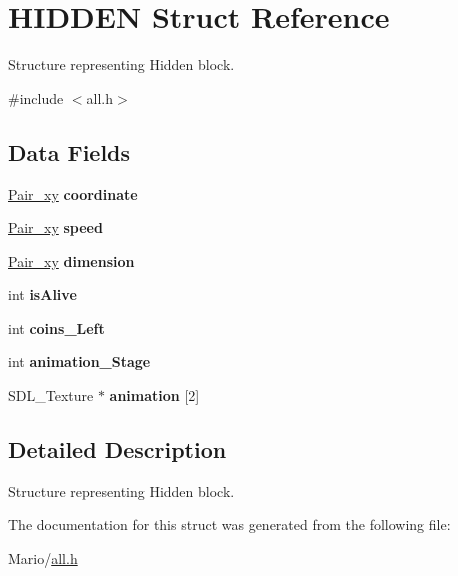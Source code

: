 \hypertarget{struct_h_i_d_d_e_n}{}\section{H\+I\+D\+D\+EN Struct Reference}
\label{struct_h_i_d_d_e_n}


Structure representing Hidden block.  




{\ttfamily \#include $<$all.\+h$>$}

\subsection*{Data Fields}
\begin{DoxyCompactItemize}
\item 
\mbox{\label{struct_h_i_d_d_e_n_a6cf77a9254df5cfd669084e0a97d9711}} 
\mbox{\hyperlink{all_8h_a9a35f73dcc6cf9a466e6542847bd8882}{Pair\+\_\+xy}} {\bfseries coordinate}
\item 
\mbox{\label{struct_h_i_d_d_e_n_a17e25b2ef4c597ac58da845ec3bce5c6}} 
\mbox{\hyperlink{all_8h_a9a35f73dcc6cf9a466e6542847bd8882}{Pair\+\_\+xy}} {\bfseries speed}
\item 
\mbox{\label{struct_h_i_d_d_e_n_a0da7d680eb31a67eac3371518ae0a6cb}} 
\mbox{\hyperlink{all_8h_a9a35f73dcc6cf9a466e6542847bd8882}{Pair\+\_\+xy}} {\bfseries dimension}
\item 
\mbox{\label{struct_h_i_d_d_e_n_a116ae74d5b3df6d48cdb0f3a6bb36a07}} 
int {\bfseries is\+Alive}
\item 
\mbox{\label{struct_h_i_d_d_e_n_a05760377f2ce05f70f79d913f09a67e6}} 
int {\bfseries coins\+\_\+\+Left}
\item 
\mbox{\label{struct_h_i_d_d_e_n_a6118bdc05fce34a198c8e8d332708235}} 
int {\bfseries animation\+\_\+\+Stage}
\item 
\mbox{\label{struct_h_i_d_d_e_n_a1fcacba509b1d227e8ed36abf701510b}} 
S\+D\+L\+\_\+\+Texture $\ast$ {\bfseries animation} \mbox{[}2\mbox{]}
\end{DoxyCompactItemize}


\subsection{Detailed Description}
Structure representing Hidden block. 

The documentation for this struct was generated from the following file\+:\begin{DoxyCompactItemize}
\item 
Mario/\mbox{\hyperlink{all_8h}{all.\+h}}\end{DoxyCompactItemize}
